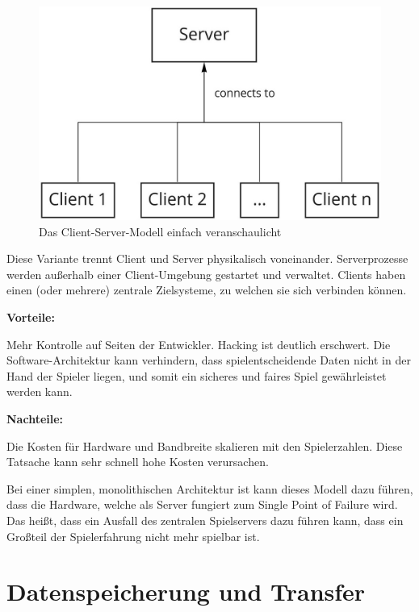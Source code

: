 \begin{figure}[H]
\centering
\includegraphics[width=150mm]{images/Client_Server.jpg}
\caption[Client-Server Modell]{Das Client-Server-Modell einfach veranschaulicht}
\label{pic:Client_Server}
\end{figure}



Diese Variante trennt Client und Server physikalisch voneinander. Serverprozesse werden außerhalb einer Client-Umgebung gestartet und verwaltet. Clients haben einen (oder mehrere) zentrale Zielsysteme, zu welchen sie sich verbinden können.

\textbf{Vorteile:}

Mehr Kontrolle auf Seiten der Entwickler. Hacking ist deutlich erschwert. Die Software-Architektur kann verhindern, dass spielentscheidende Daten nicht in der Hand der Spieler liegen, und somit ein sicheres und faires Spiel gewährleistet werden kann.
\cite{Smed.2002}

\textbf{Nachteile:}

Die Kosten für Hardware und Bandbreite skalieren mit den Spielerzahlen. Diese Tatsache kann sehr schnell hohe Kosten verursachen. \cite{Deng.2018}

Bei einer simplen, monolithischen Architektur ist kann dieses Modell dazu führen, dass die Hardware, welche als Server fungiert zum Single Point of Failure wird. Das heißt, dass ein Ausfall des zentralen Spielservers dazu führen kann, dass ein Großteil der Spielerfahrung nicht mehr spielbar ist.

\section{Datenspeicherung und Transfer}

